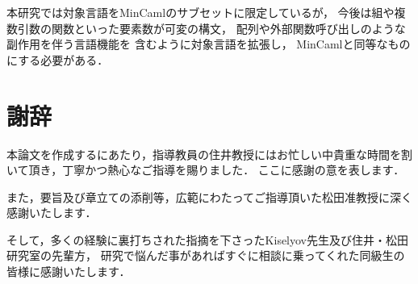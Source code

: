\documentclass{sumiilab-paper}
\begin{document}
本研究では対象言語をMinCamlのサブセットに限定しているが，
今後は組や複数引数の関数といった要素数が可変の構文，
配列や外部関数呼び出しのような副作用を伴う言語機能を
含むように対象言語を拡張し，
MinCamlと同等なものにする必要がある．

\chapter*{謝辞}

本論文を作成するにあたり，指導教員の住井教授にはお忙しい中貴重な時間を割いて頂き，丁寧かつ熱心なご指導を賜りました．
ここに感謝の意を表します．

また，要旨及び章立ての添削等，広範にわたってご指導頂いた松田准教授に深く感謝いたします．

そして，多くの経験に裏打ちされた指摘を下さったKiselyov先生及び住井・松田研究室の先輩方，
研究で悩んだ事があればすぐに相談に乗ってくれた同級生の皆様に感謝いたします．



\end{document}
